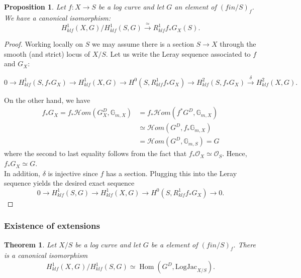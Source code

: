\documentclass[a4paper,11pt]{amsart} %
\numberwithin{equation}{subsection}
\def\sheafhom{\mathcal{H}om}
\newcommand{\Hom}{\operatorname{Hom}}
\theoremstyle{definition}
\theoremstyle{plain}%
\newtheorem{proposition}[definition]{Proposition}
\newtheorem{theorem}[definition]{Theorem}
\theoremstyle{remark}
\begin{document}
\begin{proposition}\label{pointedlog}
Let $f: X \to S$ be a log curve and let $G$ an element of $(fin/S)_f$. We have a canonical isomorphism:
 $$H^1_{klf}(X,G)/H^1_{klf}(S,G) \xrightarrow{\simeq} R^1_{klf}f_*G_{X}(S). $$
\end{proposition} 
\begin{proof}

Working locally on $S$ we may assume there is a section $S \to X$ through the smooth (and strict) locus of $X/S$. Let us write the Leray sequence associated to $f$ and $G_{X}$:

\begin{small}
$0 \to H^1_{klf}(S, f_*G_{X}) \to H^1_{klf}(X,G) \to H^0(S,R^1_{klf}f_*G_{X}) \to H^2_{klf}(S, f_*G_{X}) \xrightarrow{\delta} H^2_{klf}(X,G).$
\end{small}
\newline
 On the other hand, we have
 \begin{align*}
 f_*G_{X}=f_* \sheafhom(G_{X}^D,\mathbb{G}_{m,X}) & = f_*\sheafhom(f^*G^D,\mathbb{G}_{m,X})\\
 &\simeq \sheafhom(G^D,f_*\mathbb{G}_{m,X})\\
 &=\sheafhom(G^D,\mathbb{G}_{m,S})=G
 \end{align*}
 where the second to last equality follows from the fact that $f_*\mathcal{O}_{X} \simeq \mathcal{O}_S$. Hence, $f_*G_{X} \simeq G$.\\
In addition, $\delta$ is injective since $f$ has a section. Plugging this into the Leray sequence yields the desired exact sequence
\begin{equation*}
0 \to H^1_{klf}(S, G) \to H^1_{klf}(X,G) \to H^0(S,R^1_{klf}f_*G_{X}) \to 0.
\end{equation*}
 \end{proof}

\subsubsection{Existence of extensions}

\begin{theorem}\label{mainrslt}
Let $X/S $ be a log curve and let $G$ be a element of $(fin/S)_f$. There is a canonical isomorphism
 \[
 H^1_{klf}(X_{},G_{})/H^1_{klf}(S,G) \simeq   {\Hom}(G^D, \mathrm{LogJac}_{X/S}).
 \]
\end{theorem}
\end{document}
